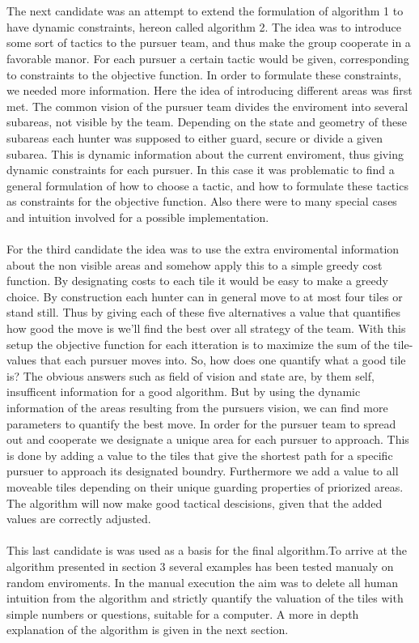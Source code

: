 \\
\\The next candidate was an attempt to extend the formulation of algorithm 1 to have dynamic constraints, hereon called algorithm 2. The idea was to introduce some sort of tactics to the pursuer team, and thus make the group cooperate in a favorable manor. For each pursuer a certain tactic would be given, corresponding to constraints to the objective function. In order to formulate these constraints, we needed more information. Here the idea of introducing different areas was first met. The common vision of the pursuer team divides the enviroment into several subareas, not visible by the team. Depending on the state and geometry of these subareas each hunter was supposed to either guard, secure or divide a given subarea. This is dynamic information about the current enviroment, thus giving dynamic constraints for each pursuer. In this case it was problematic to find a general formulation of how to choose a tactic, and how to formulate these tactics as constraints for the objective function. Also there were to many special cases and intuition involved for a possible implementation.
\\
\\For the third candidate the idea was to use the extra enviromental information about the non visible areas and somehow apply this to a simple greedy cost function. By designating costs to each tile it would be easy to make a greedy choice. By construction each hunter can in general move to at most four tiles or stand still. Thus by giving each of these five alternatives a value that quantifies how good the move is we'll find the best over all strategy of the team. With this setup the objective function for each itteration is to maximize the sum of the tile-values that each pursuer moves into. So, how does one quantify what  a good tile is? The obvious answers such as field of vision and state are, by them self, insufficent information for a good algorithm. But by using the dynamic information of the areas resulting from the pursuers vision, we can find more parameters to quantify the best move. In order for the pursuer team to spread out and cooperate we designate a unique area for each pursuer to approach. This is done by adding a value to the tiles that give the shortest path for a specific pursuer to approach its designated boundry. Furthermore we add a value to all moveable tiles depending on their unique guarding properties of priorized areas. The algorithm will now make good tactical descisions, given that the added values are correctly adjusted. 
\\
\\This last candidate is was used as a basis for the final algorithm.To arrive at the algorithm presented in section 3 several examples has been tested manualy on random enviroments. In the manual execution the aim was to delete all human intuition from the algorithm and strictly quantify the valuation of the tiles with simple numbers or questions, suitable for a computer. A more in depth explanation of the algorithm is given in the next section.
